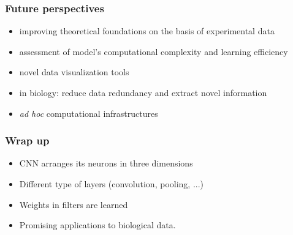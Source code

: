 \begin{frame}
        \frametitle{Future perspectives}

        \begin{itemize}
		\item improving theoretical foundations on the basis of experimental data
		\item assessment of model's computational complexity and learning efficiency
		\item novel data visualization tools
		\item in biology: reduce data redundancy and extract novel information
		\item \textit{ad hoc} computational infrastructures
	\end{itemize}

\end{frame}

\begin{frame}
        \frametitle{Wrap up}

        \begin{itemize}
                \item CNN arranges its neurons in three dimensions
                \item Different type of layers (convolution, pooling, ...)
                \item Weights in filters are learned
		\item Promising applications to biological data.
        \end{itemize}

\end{frame}








